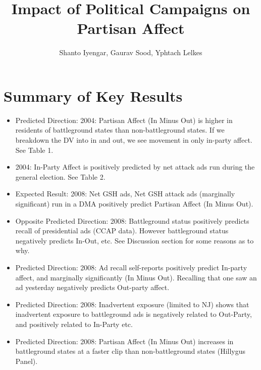 \documentclass[doc,fignum,noapacite]{apa}
\begin{document}
\pagestyle{headings}
\title{Impact of Political Campaigns on Partisan Affect}
\author{Shanto Iyengar, Gaurav Sood, Yphtach Lelkes}
\maketitle
\begin{comment}
sweaver("C:/Users/Gaurav/Desktop/R/polar/dma","campaign")

setwd("C:/Users/Gaurav/Desktop/R/polar/dma/")
Stangle("C:/Users/Gaurav/Desktop/R/polar/dma/campaign.Rnw")

\end{comment}
\linespread{1.2}
\section{Summary of Key Results}
\begin{itemize}
	\item Predicted Direction: 2004: Partisan Affect (In Minus Out) is higher in residents of battleground states than 
	non-battleground states. If we breakdown the DV into in and out, we see movement in only in-party affect. See Table 1.
	\item 2004: In-Party Affect is positively predicted by net attack ads run during the general election. See Table 2.
	\item Expected Result: 2008: Net GSH ads, Net GSH attack ads (marginally significant) run in a DMA positively predict Partisan Affect 
	(In Minus Out).
	\item Opposite Predicted Direction: 2008: Battleground status positively predicts recall of presidential ads (CCAP data). However battleground status
	negatively predicts In-Out, etc. See Discussion section for some reasons as to why. 
	\item Predicted Direction: 2008: Ad recall self-reports positively predict In-party affect, and marginally significantly (In Minus Out). 
	Recalling that one saw an ad yesterday negatively predicts Out-party affect.
	\item Predicted Direction: 2008: Inadvertent exposure (limited to NJ) shows that inadvertent exposure to battleground ads is 
	negatively related to Out-Party, and positively related to In-Party etc.
	\item Predicted Direction: 2008: Partisan Affect (In Minus Out) increases in battleground states at a faster clip than 
	non-battleground states (Hillygus Panel).
\end{itemize}
\end{document}
